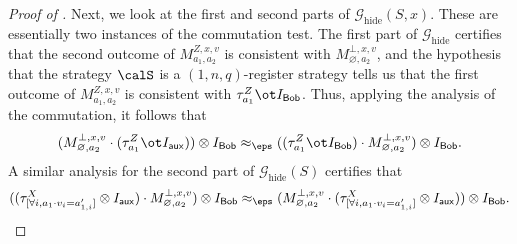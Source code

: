 \documentclass[11pt]{article}
\newcommand{\game}{\mathscr{G}}
\newcommand{\reg}[1]{{\mathsf{#1}}}
\begin{document}
\begin{proof}[Proof of ]
  Next, we look at the first and second parts of $\game_{\mathrm{hide}}(S,x)$. These are
  essentially two instances of the commutation test. The first part of
  $\game_{\mathrm{hide}}$ certifies that the second outcome of $M^{Z,
    x,v}_{a_1, a_2}$ is consistent with $M^{\bot, x,v}_{\varnothing,
    a_2}$, and the hypothesis that the strategy $\calS$ is a
  $(1,n,q)$-register strategy tells us that the first outcome of
  $M^{Z,x,v}_{a_1, a_2}$ is consistent with $\tau^Z_{a_1} \ot I_{\reg{Bob}}$. Thus,
  applying the analysis of the commutation, it follows that
  \[ (M^{\bot, x,v }_{\varnothing, a_2} \cdot (\tau^Z_{a_1} \ot I_{\reg{aux}})) \otimes I_{\reg{Bob}} \approx_{\eps}
    ((\tau^Z_{a_1} \ot I_{\reg{Bob}})\cdot M^{\bot, x,v}_{\varnothing, a_2}) \otimes I_{\reg{Bob}}. \]
  A similar analysis for the second part of $\game_{\mathrm{hide}}(S)$
  certifies that
\[
((\tau^{X}_{[\forall i, a_1 \cdot v_i = a'_{1,i}]} \otimes
I_{\reg{aux}})\cdot M_{\varnothing, a_2}^{\bot,x, v}) \otimes I_{\reg{Bob}}
\approx_{\eps} (M_{\varnothing, a_2}^{\bot, x, v} \cdot(\tau^{X}_{[\forall i, a_1 \cdot v_i = a'_{1,i}]} \otimes I_{\reg{aux}})) \otimes I_{\reg{Bob}}.
\]


\end{proof}
\end{document}
